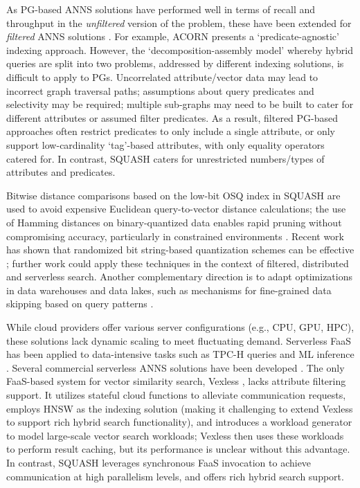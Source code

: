 As PG-based ANNS solutions have performed well in terms of recall and throughput in the \textit{unfiltered} version of the problem, these have been extended for \textit{filtered} ANNS solutions \cite{NEURIPS2023-Wang-NHQ, wang2022navigableproximitygraphdrivennative-NHQ-2, Patel2024ACORN, zhao2022constrainedapproximatesimilaritysearchAIRSHIP, Gollapudi2023FilteredDiskANN}. 
For example, ACORN \cite{Patel2024ACORN} presents a `predicate-agnostic' indexing approach. 
However, the `decomposition-assembly model' \cite{NEURIPS2023-Wang-NHQ} whereby hybrid queries are split into two problems, addressed by different indexing solutions, is difficult to apply to PGs. 
Uncorrelated attribute/vector data may lead to incorrect graph traversal paths; assumptions about query predicates and selectivity may be required; multiple sub-graphs may need to be built to cater for different attributes or assumed filter predicates. 
As a result, filtered PG-based approaches often restrict predicates to only include a single attribute, or only support low-cardinality `tag'-based attributes, with only equality operators catered for. In contrast, SQUASH caters for unrestricted numbers/types of attributes and predicates. 

Bitwise distance comparisons based on the low-bit OSQ index in SQUASH are used to avoid expensive Euclidean query-to-vector distance calculations;
the use of Hamming distances on binary-quantized data enables rapid pruning without compromising accuracy, particularly in constrained environments \cite{MARUKATAT20131101, Martin2015}. Recent work has shown that randomized bit string-based quantization schemes can be effective \cite{RabitQ2024}; further work could apply these techniques in the context of filtered, distributed and serverless search. Another complementary direction is to adapt optimizations in data warehouses and data lakes, such as mechanisms for fine-grained data skipping based on query patterns \cite{2014SunDataSkipping}.
 
While cloud providers offer various server configurations (e.g., CPU, GPU, HPC), these solutions lack dynamic scaling to meet fluctuating demand. Serverless FaaS has been applied to data-intensive tasks such as TPC-H queries \cite{Muller2020Lambada, Perron2020} and ML inference \cite{Oakley2024FSDInference, Gillis2021, Jarachanthan2021AMPS, Oakley2024ForesightPlus}. Several commercial serverless ANNS solutions have been developed \cite{Weaviate, DatastaxAstraDB,Pinecone-Serverless, TurboPuffer, Upstash}.
The only FaaS-based system for vector similarity search, Vexless \cite{Su2024Vexless}, lacks attribute filtering support. 
It utilizes stateful cloud functions to alleviate communication requests, employs HNSW as the indexing solution (making it challenging to extend Vexless to support rich hybrid search functionality), and introduces a workload generator to model large-scale vector search workloads; Vexless then uses these workloads to perform result caching, but its performance is unclear without this advantage.
In contrast, SQUASH leverages synchronous FaaS invocation to achieve communication at high parallelism levels, and offers rich hybrid search support.
